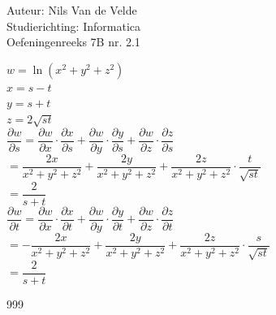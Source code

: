 \documentclass[a4paper]{article}
\begin{document}
  
\noindent \large Auteur: Nils Van de Velde \\
\noindent \large Studierichting: Informatica\\
\noindent \large Oefeningenreeks 7B nr. 2.1\\

\medskip

\normalsize

$w = \ln(x^2+y^2+z^2)$\\

$x=s-t$\\

$y=s+t$\\

$z=2\sqrt{st}$\\

$\dfrac{\partial w}{\partial s} = \dfrac{\partial w}{\partial x}\cdot\dfrac{\partial x}{\partial s}+\dfrac{\partial w}{\partial y}\cdot\dfrac{\partial y}{\partial s}+\dfrac{\partial w}{\partial z}\cdot\dfrac{\partial z}{\partial s}$\\

$=\dfrac{2x}{x^2+y^2+z^2}+\dfrac{2y}{x^2+y^2+z^2}+\dfrac{2z}{x^2+y^2+z^2}\cdot\dfrac{t}{\sqrt{st}}$\\

$=\dfrac{2}{s+t}$\\

$\dfrac{\partial w}{\partial t} = \dfrac{\partial w}{\partial x}\cdot\dfrac{\partial x}{\partial t}+\dfrac{\partial w}{\partial y}\cdot\dfrac{\partial y}{\partial t}+\dfrac{\partial w}{\partial z}\cdot\dfrac{\partial z}{\partial t}$\\

$=-\dfrac{2x}{x^2+y^2+z^2}+\dfrac{2y}{x^2+y^2+z^2}+\dfrac{2z}{x^2+y^2+z^2}\cdot\dfrac{s}{\sqrt{st}}$\\

$=\dfrac{2}{s+t}$\\

\begin{thebibliography}{999}
\end{thebibliography}
\end{document}
